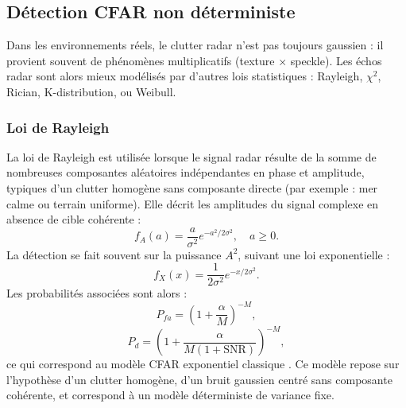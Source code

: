 \subsection{Détection CFAR non déterministe}

Dans les environnements réels, le clutter radar n’est pas toujours gaussien : il provient souvent de phénomènes multiplicatifs (texture × speckle).  
Les échos radar sont alors mieux modélisés par d’autres lois statistiques : Rayleigh, $\chi^2$, Rician, K-distribution, ou Weibull.


\subsubsection{Loi de Rayleigh}

La loi de Rayleigh est utilisée lorsque le signal radar résulte de la somme de nombreuses composantes aléatoires indépendantes en phase et amplitude, typiques d’un clutter homogène sans composante directe (par exemple : mer calme ou terrain uniforme).  
Elle décrit les amplitudes du signal complexe en absence de cible cohérente :
\begin{equation}
f_A(a)=\frac{a}{\sigma^2} e^{-a^2/2\sigma^2}, \quad a\ge0.
\end{equation}
La détection se fait souvent sur la puissance $A^2$, suivant une loi exponentielle :
\begin{equation}
f_X(x) = \frac{1}{2\sigma^2} e^{-x/2\sigma^2}.
\end{equation}
Les probabilités associées sont alors :
\begin{equation}
P_{fa} = \left(1+\frac{\alpha}{M}\right)^{-M},
\end{equation}
\begin{equation}
P_d = \left(1+\frac{\alpha}{M(1+\mathrm{SNR})}\right)^{-M},
\end{equation}
ce qui correspond au modèle CFAR exponentiel classique \cite{skolnik2001, richards2005}.  
Ce modèle repose sur l’hypothèse d’un clutter homogène, d’un bruit gaussien centré sans composante cohérente, et correspond à un modèle déterministe de variance fixe.


